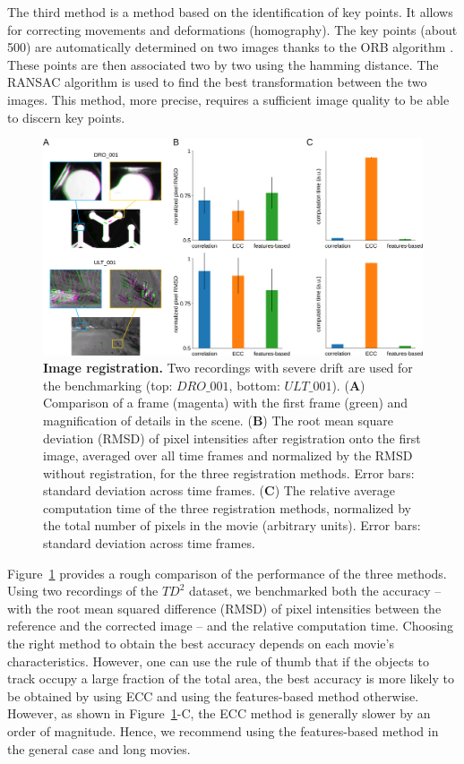     The third method is a method based on the identification of key points. It allows for correcting movements and deformations (homography). The key points (about 500) are automatically determined on two images thanks to the ORB algorithm \cite{rublee2011orb}. These points are then associated two by two using the hamming distance. The RANSAC algorithm \cite{bolles1981ransac} is used to find the best transformation between the two images. This method, more precise, requires a sufficient image quality to be able to discern key points.

    \begin{figure}[h!]
    \centering
    \includegraphics[width=1\textwidth]{part_1/assets/Figure_2.png}
    \caption{{\bf Image registration.} Two recordings with severe drift are used for the benchmarking (top: $DRO\_001$, bottom: $ULT\_001$).
        (\textbf{A}) Comparison of a frame (magenta) with the first frame (green) and magnification of details in the scene.
        (\textbf{B}) The root mean square deviation (RMSD) of pixel intensities after registration onto the first image, averaged over all time frames and normalized by the RMSD without registration, for the three registration methods. Error bars: standard deviation across time frames.
        (\textbf{C}) The relative average computation time of the three registration methods, normalized by the total number of pixels in the movie (arbitrary units). Error bars: standard deviation across time frames.}
    \label{part_1:fig_2}
    \end{figure}

    Figure~\ref{part_1:fig_2} provides a rough comparison of the performance of the three methods. Using two recordings of the $TD^{2}$ dataset, we benchmarked both the accuracy – with the root mean squared difference (RMSD) of pixel intensities between the reference and the corrected image – and the relative computation time. Choosing the right method to obtain the best accuracy depends on each movie’s characteristics. However, one can use the rule of thumb that if the objects to track occupy a large fraction of the total area, the best accuracy is more likely to be obtained by using ECC and using the features-based method otherwise. However, as shown in Figure~\ref{part_1:fig_2}-C, the ECC method is generally slower by an order of magnitude. Hence, we recommend using the features-based method in the general case and long movies.

